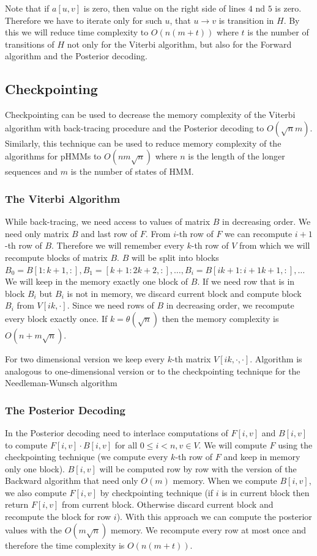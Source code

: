 Note that if $a[u,v]$ is zero, then value on the right side of lines $4$ nd $5$
is zero. Therefore we have to iterate only for such $u$, that $u\to v$ is
transition in $H$. By this we will reduce time complexity to $O(n(m+t))$ where
$t$ is the number of transitions of $H$ not only for the Viterbi algorithm, but
also for the Forward algorithm and the Posterior decoding.


\subsection{Checkpointing}
\label{SECTION:HMMCHECKPOINTING}
Checkpointing can be used to decrease the memory complexity of the Viterbi
algorithm with back-tracing procedure and the Posterior decoding to $O(\sqrt n
m)$.  Similarly, this technique can be used to reduce memory complexity of the
algorithms for pHMMs to $O(nm\sqrt n )$ where $n$ is the length of the longer
sequences and $m$ is the number of states of HMM.

\subsubsection{The Viterbi Algorithm}
While back-tracing, we need access to values of matrix $B$ in decreasing order.
We need only matrix $B$ and last row of $F$. From $i$-th row of $F$ we can
recompute $i+1$-th row of $B$. Therefore we will remember every $k$-th row
of $V$ from which we will recompute blocks of matrix $B$. $B$ will be split into
blocks
$B_0=B[1:k+1,:],B_1=[k+1:2k+2,:],\dots,B_i=B[ik+1:{i+1}k+1,:],\dots$
We will keep in the memory exactly one block of $B$. If we need row that is in block
$B_i$ but $B_i$ is not in memory, we discard current block and compute block
$B_i$ from $V[ik,\cdot]$. Since we need rows of $B$ in decreasing order, we
recompute every block exactly once. If $k=\theta(\sqrt n)$ then the memory
complexity is  $O(n+m\sqrt n)$.

For two dimensional version we keep every $k$-th matrix $V[ik,\cdot,\cdot]$.
Algorithm is analogous to one-dimensional version or to the checkpointing
technique for the Needleman-Wunsch algorithm

\subsubsection{The Posterior Decoding}

In the Posterior decoding need to interlace computations of $F[i,v]$ and
$B[i,v]$ to compute $F[i,v]\cdot B[i,v]$ for all $0\leq i<n,v\in V$. We will
compute $F$ using the checkpointing technique (we compute every $k$-th row of
$F$ and keep in memory only one block).  $B[i,v]$ will be computed row by row
with the version of the  Backward algorithm that need only $O(m)$ memory. When
we compute $B[i,v]$, we also compute $F[i,v]$ by checkpointing technique (if $i$ is in
current block then return $F[i,v]$ from current block. Otherwise discard current
block and recompute the block for row $i$). With this approach we can
compute the posterior values with the $O(m\sqrt n)$ memory. We recompute every row at most
once and therefore the time complexity is $O(n(m+t))$.

